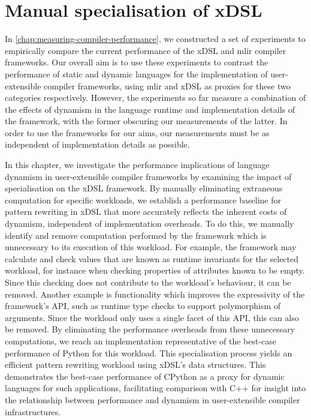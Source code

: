 \chapter{Manual specialisation of xDSL}
\label{chap:specialising-optimising-pattern-rewriting}

In \autoref{chap:measuring-compiler-performance}, we constructed a set of experiments to empirically compare the current performance of the xDSL and \ac{mlir} compiler frameworks.
Our overall aim is to use these experiments to contrast the performance of static and dynamic languages for the implementation of user-extensible compiler frameworks, using \ac{mlir} and xDSL as proxies for these two categories respectively.
However, the experiments so far measure a combination of the effects of dynamism in the language runtime and implementation details of the framework, with the former obscuring our measurements of the latter.
In order to use the frameworks for our aims, our measurements must be as independent of implementation details as possible.

In this chapter, we investigate the performance implications of language dynamism in user-extensible compiler frameworks by examining the impact of specialisation on the xDSL framework. By manually eliminating extraneous computation for specific workloads, we establish a performance baseline for pattern rewriting in xDSL that more accurately reflects the inherent costs of dynamism, independent of implementation overheads.
To do this, we manually identify and remove computation performed by the framework which is unnecessary to its execution of this workload. For example, the framework may calculate and check values that are known as runtime invariants for the selected workload, for instance when checking properties of attributes known to be empty.
Since this checking does not contribute to the workload's behaviour, it can be removed. Another example is functionality which improves the expressivity of the framework's API, such as runtime type checks to support polymorphism of arguments. Since the workload only uses a single facet of this API, this can also be removed.
By eliminating the performance overheads from these unnecessary computations, we reach an implementation representative of the best-case performance of Python for this workload.
This specialisation process yields an efficient pattern rewriting workload using xDSL's data structures. This demonstrates the best-case performance of CPython as a proxy for dynamic languages for such applications, facilitating comparison with C++ for insight into the relationship between performance and dynamism in user-extensible compiler infrastructures.


